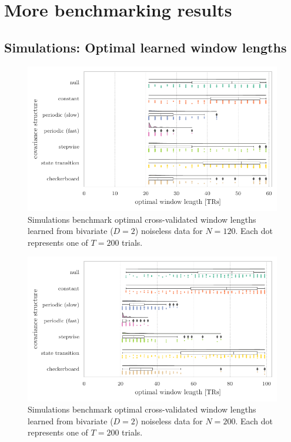 \chapter{More benchmarking results}\label{appendix:more-benchmarking-results}

\section{Simulations: Optimal learned window lengths}\label{appendix:sim-optimal-window-lengths}


\begin{figure}[ht]
  \centering
  \includegraphics[width=\textwidth]{fig/sim/d2/N0120_T0200/no_noise/SW_cross_validated_optimal_window_lengths}
  \caption{
    Simulations benchmark optimal cross-validated window lengths learned from bivariate ($D = 2$) noiseless data for $N = 120$.
    Each dot represents one of $T = 200$ trials.
  }\label{fig:sim-optimal-window-lengths-N120}
\end{figure}


\begin{figure}[ht]
  \centering
  \includegraphics[width=\textwidth]{fig/sim/d2/N0200_T0200/no_noise/SW_cross_validated_optimal_window_lengths}
  \caption{
    Simulations benchmark optimal cross-validated window lengths learned from bivariate ($D = 2$) noiseless data for $N = 200$.
    Each dot represents one of $T = 200$ trials.
  }\label{fig:sim-optimal-window-lengths-N200}
\end{figure}



